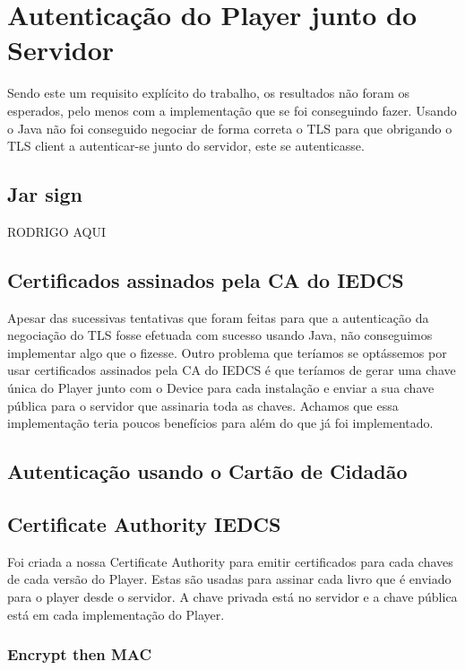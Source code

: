 \documentclass[pdftex,12pt,a4paper]{report}
\begin{document}
\section{Autenticação do Player junto do Servidor}

Sendo este um requisito explícito do trabalho, os resultados não foram os esperados, pelo menos com a implementação que se foi conseguindo fazer. Usando o Java não foi conseguido negociar de forma correta o TLS para que obrigando o TLS client a autenticar-se junto do servidor, este se autenticasse.

\subsection{Jar sign}
RODRIGO AQUI

\subsection{Certificados assinados pela CA do IEDCS}
Apesar das sucessivas tentativas que foram feitas para que a autenticação da negociação do TLS fosse efetuada com sucesso usando Java, não conseguimos implementar algo que o fizesse. Outro problema que teríamos se optássemos por usar certificados assinados pela CA do IEDCS é que teríamos de gerar uma chave única do Player junto com o Device para cada instalação e enviar a sua chave pública para o servidor que assinaria toda as chaves. Achamos que essa implementação teria poucos benefícios para além do que já foi implementado.

\subsection{Autenticação usando o Cartão de Cidadão}

\subsection{Certificate Authority IEDCS}
Foi criada a nossa Certificate Authority para emitir certificados para cada chaves de cada versão do Player. Estas são usadas para assinar cada livro que é enviado para o player desde o servidor. A chave privada está no servidor e a chave pública está em cada implementação do Player.

\subsubsection{Encrypt then MAC}
\end{document}
